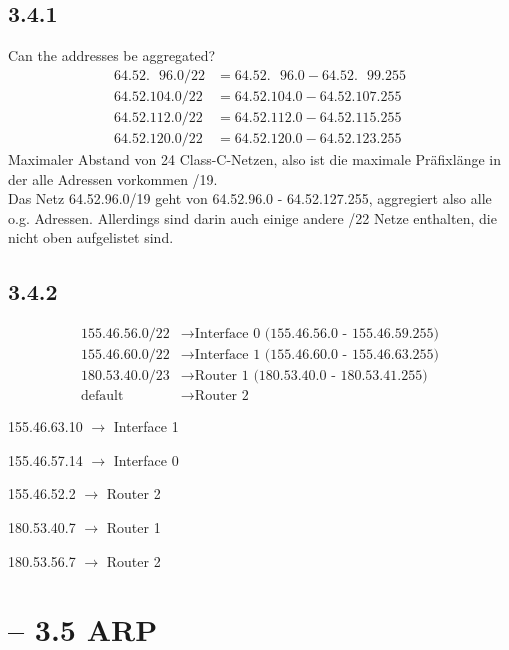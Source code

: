 \documentclass[a4paper,
			llpt,
			solution,
			accentcolor=tud2d,
			colorbacktitle
			]
			{tudexercise}
\newcommand{\8}{$\infty$}
\begin{document}
\subsection{3.4.1}
Can the addresses be aggregated?\\
\begin{align*}
64.52.\text{~~}96.0/22 &= 64.52.\text{~~}96.0 - 64.52.\text{~~}99.255 \\
64.52.104.0/22 &= 64.52.104.0 - 64.52.107.255 \\
64.52.112.0/22 &= 64.52.112.0 - 64.52.115.255 \\
64.52.120.0/22 &= 64.52.120.0 - 64.52.123.255
\end{align*}
Maximaler Abstand von 24 Class-C-Netzen, also ist die maximale Präfixlänge in
der alle Adressen vorkommen /19.\\
Das Netz 64.52.96.0/19 geht von 64.52.96.0 - 64.52.127.255, aggregiert also alle o.g. Adressen. Allerdings sind darin auch einige andere /22 Netze enthalten, die nicht oben aufgelistet sind.

\subsection{3.4.2}
\begin{align*}
155.46.56.0/22 &\rightarrow \text{Interface 0 (155.46.56.0 - 155.46.59.255)}\\
155.46.60.0/22 &\rightarrow \text{Interface 1 (155.46.60.0 - 155.46.63.255)}\\
180.53.40.0/23 &\rightarrow \text{Router 1 (180.53.40.0 - 180.53.41.255)}\\
\text{default} &\rightarrow \text{Router 2}
\end{align*}
\begin{multicols}{3}
\begin{compactenum}
\item 155.46.63.10 $\rightarrow$ Interface 1
\item 155.46.57.14 $\rightarrow$ Interface 0
\item 155.46.52.2  $\rightarrow$ Router 2
\item 180.53.40.7  $\rightarrow$ Router 1
\item 180.53.56.7  $\rightarrow$ Router 2
\end{compactenum}
\end{multicols}
\section{ -- 3.5 ARP}
\end{document}
